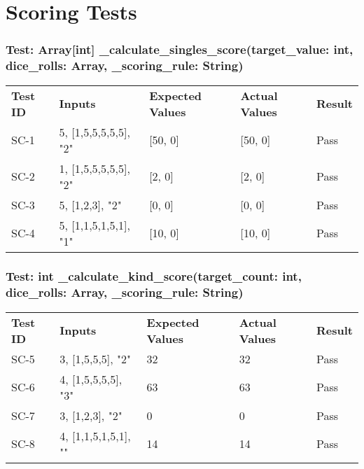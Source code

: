 \documentclass[12pt, titlepage]{article}
\begin{document}
\section{Scoring Tests}

\subsubsection{Test: Array[int] \_calculate\_singles\_score(target\_value: int, dice\_rolls: Array, \_scoring\_rule: String)}
\begin{tabularx}{\textwidth}{|p{2cm}|p{3.5cm}|p{4cm}|p{4cm}|p{1.5cm}|}
    \cline{1-5}
    \textbf{Test ID} & \textbf{Inputs} & \textbf{Expected Values} & \textbf{Actual Values} & \textbf{Result} \\
    \cline{1-5}
    SC-1 & 5, [1,5,5,5,5,5], "2" & [50, 0] & [50, 0] & Pass \\
    \cline{1-5}
    SC-2 & 1, [1,5,5,5,5,5], "2" & [2, 0] & [2, 0] & Pass \\
    \cline{1-5}
    SC-3 & 5, [1,2,3], "2" & [0, 0] & [0, 0] & Pass \\
    \cline{1-5}
    SC-4 & 5, [1,1,5,1,5,1], "1" & [10, 0] & [10, 0] & Pass \\
    \cline{1-5}
\end{tabularx}

\subsubsection{Test: int \_calculate\_kind\_score(target\_count: int, dice\_rolls: Array, \_scoring\_rule: String)}
\begin{tabularx}{\textwidth}{|p{2cm}|p{3.5cm}|p{4cm}|p{4cm}|p{1.5cm}|}
    \cline{1-5}
    \textbf{Test ID} & \textbf{Inputs} & \textbf{Expected Values} & \textbf{Actual Values} & \textbf{Result} \\
    \cline{1-5}
    SC-5 & 3, [1,5,5,5], "2" & 32 & 32 & Pass \\
    \cline{1-5}
    SC-6 & 4, [1,5,5,5,5], "3" & 63 & 63 & Pass \\
    \cline{1-5}
    SC-7 & 3, [1,2,3], "2" & 0 & 0 & Pass \\
    \cline{1-5}
    SC-8 & 4, [1,1,5,1,5,1], "" & 14 & 14 & Pass \\
    \cline{1-5}
\end{tabularx}
\end{document}
